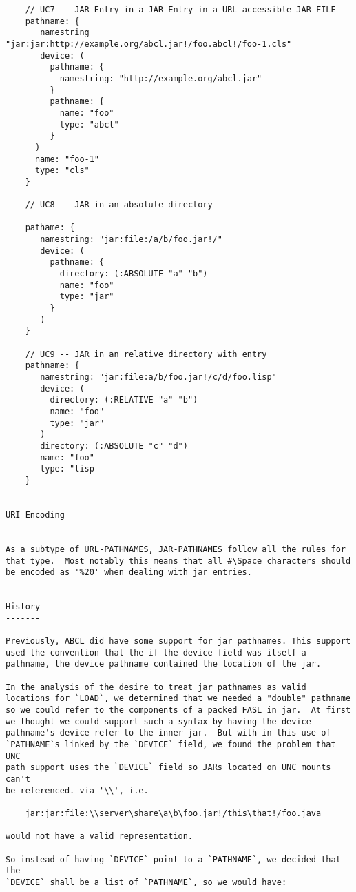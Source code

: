 \begin{verbatim}
    // UC7 -- JAR Entry in a JAR Entry in a URL accessible JAR FILE
    pathname: {
       namestring  "jar:jar:http://example.org/abcl.jar!/foo.abcl!/foo-1.cls"
       device: (
         pathname: {
           namestring: "http://example.org/abcl.jar"
         }
         pathname: { 
           name: "foo"
           type: "abcl"
         }
      )
      name: "foo-1"
      type: "cls"
    }

    // UC8 -- JAR in an absolute directory

    pathame: {
       namestring: "jar:file:/a/b/foo.jar!/"
       device: (
         pathname: {
           directory: (:ABSOLUTE "a" "b")
           name: "foo"
           type: "jar"
         }
       )
    }

    // UC9 -- JAR in an relative directory with entry
    pathname: {
       namestring: "jar:file:a/b/foo.jar!/c/d/foo.lisp"
       device: (
         directory: (:RELATIVE "a" "b")
         name: "foo"
         type: "jar"
       )
       directory: (:ABSOLUTE "c" "d")
       name: "foo"
       type: "lisp
    }


URI Encoding 
------------

As a subtype of URL-PATHNAMES, JAR-PATHNAMES follow all the rules for
that type.  Most notably this means that all #\Space characters should
be encoded as '%20' when dealing with jar entries.


History
-------

Previously, ABCL did have some support for jar pathnames. This support
used the convention that the if the device field was itself a
pathname, the device pathname contained the location of the jar.

In the analysis of the desire to treat jar pathnames as valid
locations for `LOAD`, we determined that we needed a "double" pathname
so we could refer to the components of a packed FASL in jar.  At first
we thought we could support such a syntax by having the device
pathname's device refer to the inner jar.  But with in this use of
`PATHNAME`s linked by the `DEVICE` field, we found the problem that UNC
path support uses the `DEVICE` field so JARs located on UNC mounts can't
be referenced. via '\\', i.e.  

    jar:jar:file:\\server\share\a\b\foo.jar!/this\that!/foo.java

would not have a valid representation.

So instead of having `DEVICE` point to a `PATHNAME`, we decided that the
`DEVICE` shall be a list of `PATHNAME`, so we would have:


\end{verbatim}
